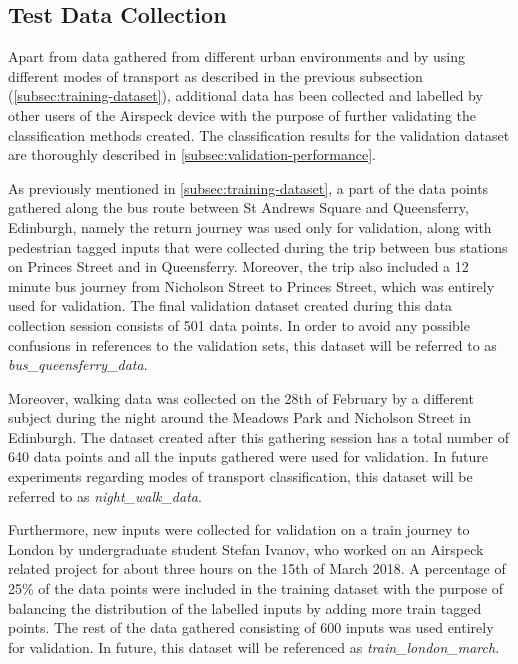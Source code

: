 \documentclass[bsc,frontabs,twoside,singlespacing, parskip,deptreport]{infthesis}     %
\begin{document}
\subsection{Test Data Collection}
\label{subsec:test-data-collection}

Apart from data gathered from different urban environments and by using different modes of transport as described in the previous subsection (\ref{subsec:training-dataset}), additional data has been collected and labelled by other users of the Airspeck device with the purpose of further validating the classification methods created. The classification results for the validation dataset are thoroughly described in \ref{subsec:validation-performance}.

As previously mentioned in \ref{subsec:training-dataset}, a part of the data points gathered along the bus route between St Andrews Square and Queensferry, Edinburgh, namely the return journey was used only for validation, along with pedestrian tagged inputs that were collected during the trip between bus stations on Princes Street and in Queensferry. Moreover, the trip also included a 12 minute bus journey from Nicholson Street to Princes Street, which was entirely used for validation. The final validation dataset created during this data collection session consists of 501 data points. In order to avoid any possible confusions in references to the validation sets, this dataset will be referred to as \textit{bus\_queensferry\_data}.

Moreover, walking data was collected on the 28th of February by a different subject during the night around the Meadows Park and Nicholson Street in Edinburgh. The dataset created after this gathering session has a total number of 640 data points and all the inputs gathered were used for validation. In future experiments regarding modes of transport classification, this dataset will be referred to as \textit{night\_walk\_data}.

Furthermore, new inputs were collected for validation on a train journey to London by undergraduate student Stefan Ivanov, who worked on an Airspeck related project for about three hours on the 15th of March 2018. A percentage of 25\% of the data points were included in the training dataset with the purpose of balancing the distribution of the labelled inputs by adding more train tagged points. The rest of the data gathered consisting of 600 inputs was used entirely for validation. In future, this dataset will be referenced as \textit{train\_london\_march}.
\end{document}
